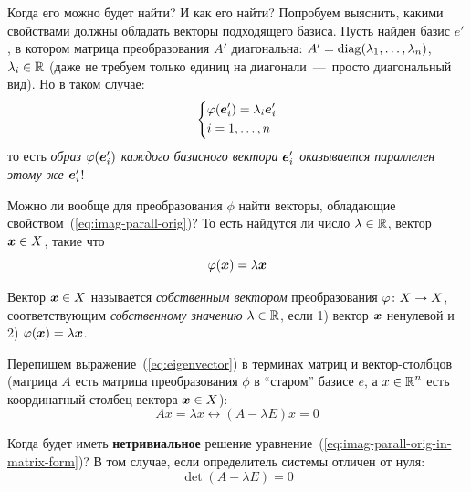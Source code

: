 \documentclass[a4paper,12pt]{article}
\begin{document}
  Когда его можно будет найти?
  И как его найти?
  Попробуем выяснить, какими свойствами должны обладать векторы подходящего базиса.
  Пусть найден базис $e'$, в котором матрица преобразования $A'$ диагональна: $A' \hm= \diag(\lambda_1, \ldots, \lambda_n)$, $\lambda_i \hm\in \RR$ (даже не требуем только единиц на диагонали~---~просто диагональный вид).
  Но в таком случае:
  \begin{equation}\label{eq:imag-parall-orig}
    \left\{
      \begin{aligned}
        &\varphi(\boldsymbol e_i') = \lambda_i \boldsymbol e_i'\\
        &i = 1, \ldots, n
      \end{aligned}
    \right.
  \end{equation}
  то есть \emph{образ $\varphi(\boldsymbol e_i')$ каждого базисного вектора $\boldsymbol e_i'$ оказывается параллелен этому же $\boldsymbol e_i'$}!
  
  Можно ли вообще для преобразования $\phi$ найти векторы, обладающие свойством~(\ref{eq:imag-parall-orig})?
  То есть найдутся ли число $\lambda \in \operatorname{\mathbb R}$, вектор $\boldsymbol x \in X$, такие что
  \begin{equation}\label{eq:eigenvector}
    \varphi(\boldsymbol x) = \lambda \boldsymbol x
  \end{equation}
  
  \begin{definition}
    Вектор $\bds x \hm\in X$ называется \emph{собственным вектором} преобразования $\phi\colon X \hm\to X$, соответствующим \emph{собственному значению} $\lambda \hm\in \RR$, если 1) вектор $\boldsymbol x$ ненулевой и 2) $\phi(\bds x) \hm= \lambda \bds x$.
  \end{definition}
  
  Перепишем выражение~(\ref{eq:eigenvector}) в терминах матриц и вектор-столбцов (матрица $A$ есть матрица преобразования $\phi$ в ``старом'' базисе $e$, а $x \hm\in \RR^n$ есть координатный столбец вектора $\bds x \hm\in X$):
  \begin{equation}\label{eq:imag-parall-orig-in-matrix-form}
    Ax = \lambda x \leftrightarrow \boxed{(A - \lambda E) x = 0}
  \end{equation}
  
  Когда будет иметь \textbf{нетривиальное} решение уравнение~(\ref{eq:imag-parall-orig-in-matrix-form})?
  В том случае, если определитель системы отличен от нуля:
  \begin{equation}\label{eq:characteristic-equation}
    \boxed{
      \det(A - \lambda E) = 0
    }
  \end{equation}
  
\end{document}
